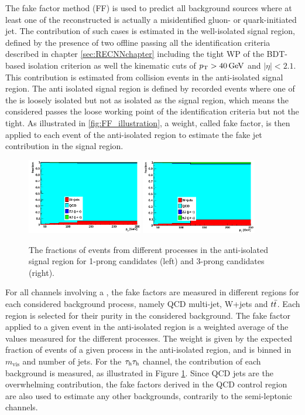 The fake factor method (FF) is used to predict all background sources where at least one of the reconstructed \tauh is actually a misidentified gluon- or quark-initiated jet. The contribution of such cases is estimated in the well-isolated signal region, defined by the presence of two offline \tauh passing all the identification criteria described in chapter \ref{sec:RECNNchapter} including the tight WP of the BDT-based isolation criterion as well the kinematic cuts of $p_{\mathrm{T}} > 40\,\mathrm{GeV}$ and $|\eta| < 2.1$. This contribution is estimated from collision events in the anti-isolated signal region. The anti isolated signal region is defined by recorded events where one of the \tauh is loosely isolated but not as isolated as the signal region, which means the considered \tauh passes the loose working point of the \tauh identification criteria but not the tight. As illustrated in \ref{fig:FF_illustration}, a weight, called fake factor, is then applied to each event of the anti-isolated region to estimate the fake jet contribution in the signal region.

\begin{figure}
    \centering
    \includegraphics[width=0.45\textwidth]{Images/FF_fraction_1prong.png}
    \includegraphics[width=0.45\textwidth]{Images/FF_fraction_3prong.png}
    \caption{The fractions of events from different processes in the anti-isolated signal region for 1-prong candidates (left) and 3-prong candidates (right).}
    \label{fig:FF_fractions}
\end{figure}

For all channels involving a \tauh, the fake factors are measured in different regions for each considered background process, namely QCD multi-jet, W+jets and $t\Bar{t}$. Each region is selected for their purity in the considered background. The fake factor applied to a given event in the anti-isolated region is a weighted average of the values measured for the different processes. The weight is given by the expected fraction of events of a given process in the anti-isolated region, and is binned in $m_{\mathrm{vis}}$ and number of jets. For the $\tau_{\rm h}\tau_{\rm h}$ channel, the contribution of each background is measured, as illustrated in Figure \ref{fig:FF_fractions}. Since QCD jets are the overwhelming contribution, the fake factors derived in the QCD control region are also used to estimate any other backgrounds, contrarily to the semi-leptonic channels.

